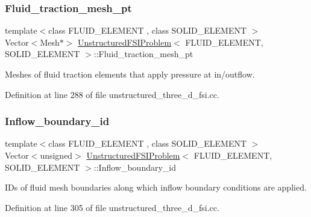 \subsubsection{\texorpdfstring{Fluid\+\_\+traction\+\_\+mesh\+\_\+pt}{Fluid\_traction\_mesh\_pt}}
{\footnotesize\ttfamily template$<$class F\+L\+U\+I\+D\+\_\+\+E\+L\+E\+M\+E\+NT , class S\+O\+L\+I\+D\+\_\+\+E\+L\+E\+M\+E\+NT $>$ \\
Vector$<$Mesh$\ast$$>$ \hyperlink{classUnstructuredFSIProblem}{Unstructured\+F\+S\+I\+Problem}$<$ F\+L\+U\+I\+D\+\_\+\+E\+L\+E\+M\+E\+NT, S\+O\+L\+I\+D\+\_\+\+E\+L\+E\+M\+E\+NT $>$\+::Fluid\+\_\+traction\+\_\+mesh\+\_\+pt\hspace{0.3cm}{\ttfamily [private]}}



Meshes of fluid traction elements that apply pressure at in/outflow. 



Definition at line 288 of file unstructured\+\_\+three\+\_\+d\+\_\+fsi.\+cc.

\mbox{\label{classUnstructuredFSIProblem_a75cb40c497f6b54e05741df6e9c430ba}} 
\subsubsection{\texorpdfstring{Inflow\+\_\+boundary\+\_\+id}{Inflow\_boundary\_id}}
{\footnotesize\ttfamily template$<$class F\+L\+U\+I\+D\+\_\+\+E\+L\+E\+M\+E\+NT , class S\+O\+L\+I\+D\+\_\+\+E\+L\+E\+M\+E\+NT $>$ \\
Vector$<$unsigned$>$ \hyperlink{classUnstructuredFSIProblem}{Unstructured\+F\+S\+I\+Problem}$<$ F\+L\+U\+I\+D\+\_\+\+E\+L\+E\+M\+E\+NT, S\+O\+L\+I\+D\+\_\+\+E\+L\+E\+M\+E\+NT $>$\+::Inflow\+\_\+boundary\+\_\+id\hspace{0.3cm}{\ttfamily [private]}}



I\+Ds of fluid mesh boundaries along which inflow boundary conditions are applied. 



Definition at line 305 of file unstructured\+\_\+three\+\_\+d\+\_\+fsi.\+cc.

\mbox{\label{classUnstructuredFSIProblem_a2e942a90cc462bf0df04ad28057d4071}} 

